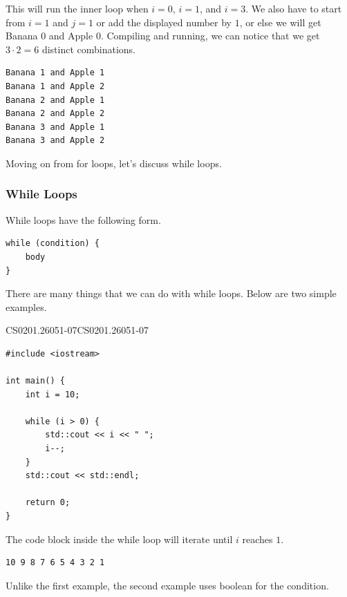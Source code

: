 \documentclass[../../../main.tex]{subfiles}
\begin{document}
This will run the inner loop when $i = 0$, $i = 1$, and $i = 3$.
We also have to start from $i = 1$ and $j = 1$ or add the
displayed number by $1$, or else we will get Banana $0$ and
Apple $0$. Compiling and running, we can notice that we get
$3 \cdot 2 = 6$ distinct combinations.

\begin{outputbox}
\begin{lstlisting}[style=basic]
Banana 1 and Apple 1
Banana 1 and Apple 2
Banana 2 and Apple 1
Banana 2 and Apple 2
Banana 3 and Apple 1
Banana 3 and Apple 2
\end{lstlisting}
\end{outputbox}

Moving on from for loops, let's discuss while loops.

\subsubsection{While Loops}

While loops have the following form.

\begin{basicbox}
\begin{lstlisting}[style=basic]
while (condition) {
    body
}
\end{lstlisting}
\end{basicbox}

There are many things that we can do with while loops. Below are
two simple examples.

\begin{cppbox}{CS0201.26051-07}{CS0201.26051-07}
\begin{lstlisting}[style=cppstyle]
#include <iostream>

int main() {
    int i = 10;

    while (i > 0) {
        std::cout << i << " ";
        i--;
    }
    std::cout << std::endl;

    return 0;
}
\end{lstlisting}
\end{cppbox}

The code block inside the while loop will iterate until $i$ reaches
$1$.

\begin{outputbox}
\begin{lstlisting}[style=basic]
10 9 8 7 6 5 4 3 2 1
\end{lstlisting}
\end{outputbox}

Unlike the first example, the second example uses boolean for the
condition.
\end{document}
